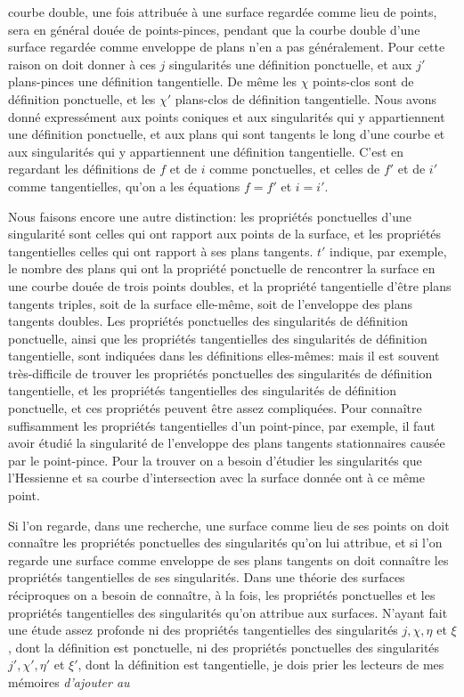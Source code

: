 \documentclass{article}
\begin{document}
courbe double, une fois attribuée à une surface regardée comme lieu de points, sera en général douée de points-pinces, pendant que la courbe double d'une surface regardée comme enveloppe de plans n'en a pas généralement. Pour cette raison on doit donner à ces $j$ singularités une définition ponctuelle, et aux $j'$ plans-pinces une définition tangentielle. De même les $\chi$ points-clos sont de définition ponctuelle, et les $\chi'$ plans-clos de définition tangentielle. Nous avons donné expressément aux points coniques et aux singularités qui y appartiennent une définition ponctuelle, et aux plans qui sont tangents le long d'une courbe et aux singularités qui y appartiennent une définition tangentielle. C'est en regardant les définitions de $f$ et de $i$ comme ponctuelles, et celles de $f'$ et de $i'$ comme tangentielles, qu'on a les équations $f = f'$ et $i = i'$.

Nous faisons encore une autre distinction: les propriétés ponctuelles d'une singularité sont celles qui ont rapport aux points de la surface, et les propriétés tangentielles celles qui ont rapport à ses plans tangents. $t'$ indique, par exemple, le nombre des plans qui ont la propriété ponctuelle de rencontrer la surface en une courbe douée de trois points doubles, et la propriété tangentielle d'être plans tangents triples, soit de la surface elle-même, soit de l'enveloppe des plans tangents doubles. Les propriétés ponctuelles des singularités de définition ponctuelle, ainsi que les propriétés tangentielles des singularités de définition tangentielle, sont indiquées dans les définitions elles-mêmes: mais il est souvent très-difficile de trouver les propriétés ponctuelles des singularités de définition tangentielle, et les propriétés tangentielles des singularités de définition ponctuelle, et ces propriétés peuvent être assez compliquées. Pour connaître suffisamment les propriétés tangentielles d'un point-pince, par exemple, il faut avoir étudié la singularité de l'enveloppe des plans tangents stationnaires causée par le point-pince. Pour la trouver on a besoin d'étudier les singularités que l'Hessienne et sa courbe d'intersection avec la surface donnée ont à ce même point.

Si l'on regarde, dans une recherche, une surface comme lieu de ses points on doit connaître les propriétés ponctuelles des singularités qu'on lui attribue, et si l'on regarde une surface comme enveloppe de ses plans tangents on doit connaître les propriétés tangentielles de ses singularités. Dans une théorie des surfaces réciproques on a besoin de connaître, à la fois, les propriétés ponctuelles et les propriétés tangentielles des singularités qu'on attribue aux surfaces. N'ayant fait une étude assez profonde ni des propriétés tangentielles des singularités $j, \chi, \eta$ et $\xi$, dont la définition est ponctuelle, ni des propriétés ponctuelles des singularités $j', \chi', \eta'$ et $\xi'$, dont la définition est tangentielle, je dois prier les lecteurs de mes mémoires \emph{d'ajouter au}
\end{document}
